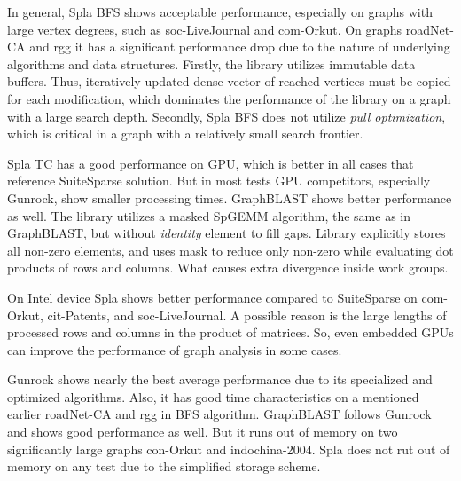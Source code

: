 In general, Spla BFS shows acceptable performance, especially on graphs with large vertex degrees, such as soc-LiveJournal and com-Orkut.
On graphs roadNet-CA and rgg it has a significant performance drop due to the nature of underlying algorithms and data structures. 
Firstly, the library utilizes immutable data buffers. Thus, iteratively updated dense vector of reached vertices must be copied for each modification, which dominates the performance of the library on a graph with a large search depth. 
Secondly, Spla BFS does not utilize \textit{pull optimization}, which is critical in a graph with a relatively small search frontier. 

Spla TC has a good performance on GPU, which is better in all cases that reference SuiteSparse solution. 
But in most tests GPU competitors, especially Gunrock, show smaller processing times. 
GraphBLAST shows better performance as well. 
The library utilizes a masked SpGEMM algorithm, the same as in GraphBLAST, but without \textit{identity} element to fill gaps. 
Library explicitly stores all non-zero elements, and uses mask to reduce only non-zero while evaluating dot products of rows and columns. 
What causes extra divergence inside work groups. 

On Intel device Spla shows better performance compared to SuiteSparse on com-Orkut, cit-Patents, and soc-LiveJournal. 
A possible reason is the large lengths of processed rows and columns in the product of matrices.
So, even embedded GPUs can improve the performance of graph analysis in some cases. 

Gunrock shows nearly the best average performance due to its specialized and optimized algorithms.
Also, it has good time characteristics on a mentioned earlier roadNet-CA and rgg in BFS algorithm. 
GraphBLAST follows Gunrock and shows good performance as well. 
But it runs out of memory on two significantly large graphs con-Orkut and indochina-2004. 
Spla does not rut out of memory on any test due to the simplified storage scheme.

